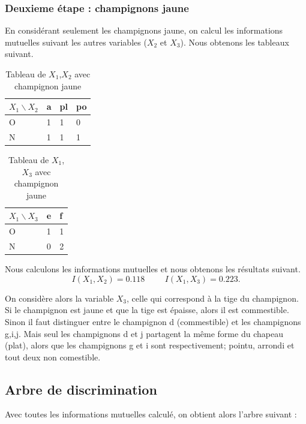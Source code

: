 \documentclass{article}
\begin{document}
\subsubsection{Deuxieme étape : champignons jaune}
En considérant seulement les champignons jaune, on calcul les informations mutuelles suivant les autres variables ($X_2$ et $X_3$). Nous obtenons les tableaux suivant.

\begin{table}[H]
  \caption{Tableau de $X_1$,$X_2$ avec champignon jaune}
  \centering
  \begin{tabular}{|l|l|l|l|}
  \hline
  $X_1\backslash X_2$ & a & pl & po \\ \hline
  O                    & 1 & 1  & 0  \\ \hline
  N                    & 1 & 1  & 1  \\ \hline
  \end{tabular}
  \end{table}

\begin{table}[H]
  \centering
  \caption{Tableau de $X_1$,$X_3$ avec champignon jaune}
  \begin{tabular}{|l|l|l|}
  \hline
  $X_1\backslash X_3$ & e & f \\ \hline
  O                    & 1 & 1 \\ \hline
  N                    & 0 & 2 \\ \hline
  \end{tabular}
  \end{table}
Nous calculons les informations mutuelles et nous obtenons les résultats suivant.
\[
  I(X_1,X_2)=0.118 \hspace{1cm} I(X_1,X_3)=0.223.
\]

On considère alors la variable $X_3$, celle qui correspond à la tige du champignon. Si le champignon est jaune et que la tige est épaisse, alors il est commestible. Sinon il faut distinguer entre le champignon d (commestible) et les champignons g,i,j.
Mais seul les champignons d et j partagent la même forme du chapeau (plat), alors que les champignons g et i sont respectivement; pointu, arrondi et tout deux non comestible.
\newpage
\subsection{Arbre de discrimination}

Avec toutes les informations mutuelles calculé, on obtient alors l'arbre suivant :
\end{document}
